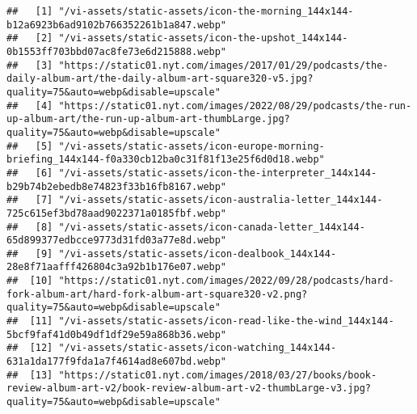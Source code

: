 \documentclass[
]{article}
\begin{document}
\begin{verbatim}
##   [1] "/vi-assets/static-assets/icon-the-morning_144x144-b12a6923b6ad9102b766352261b1a847.webp"                                                                                                             
##   [2] "/vi-assets/static-assets/icon-the-upshot_144x144-0b1553ff703bbd07ac8fe73e6d215888.webp"                                                                                                              
##   [3] "https://static01.nyt.com/images/2017/01/29/podcasts/the-daily-album-art/the-daily-album-art-square320-v5.jpg?quality=75&auto=webp&disable=upscale"                                                   
##   [4] "https://static01.nyt.com/images/2022/08/29/podcasts/the-run-up-album-art/the-run-up-album-art-thumbLarge.jpg?quality=75&auto=webp&disable=upscale"                                                   
##   [5] "/vi-assets/static-assets/icon-europe-morning-briefing_144x144-f0a330cb12ba0c31f81f13e25f6d0d18.webp"                                                                                                 
##   [6] "/vi-assets/static-assets/icon-the-interpreter_144x144-b29b74b2ebedb8e74823f33b16fb8167.webp"                                                                                                         
##   [7] "/vi-assets/static-assets/icon-australia-letter_144x144-725c615ef3bd78aad9022371a0185fbf.webp"                                                                                                        
##   [8] "/vi-assets/static-assets/icon-canada-letter_144x144-65d899377edbcce9773d31fd03a77e8d.webp"                                                                                                           
##   [9] "/vi-assets/static-assets/icon-dealbook_144x144-28e8f71aafff426804c3a92b1b176e07.webp"                                                                                                                
##  [10] "https://static01.nyt.com/images/2022/09/28/podcasts/hard-fork-album-art/hard-fork-album-art-square320-v2.png?quality=75&auto=webp&disable=upscale"                                                   
##  [11] "/vi-assets/static-assets/icon-read-like-the-wind_144x144-5bcf9faf41d0b49df1df29e59a868b36.webp"                                                                                                      
##  [12] "/vi-assets/static-assets/icon-watching_144x144-631a1da177f9fda1a7f4614ad8e607bd.webp"                                                                                                                
##  [13] "https://static01.nyt.com/images/2018/03/27/books/book-review-album-art-v2/book-review-album-art-v2-thumbLarge-v3.jpg?quality=75&auto=webp&disable=upscale"                                           

\end{verbatim}
\end{document}
